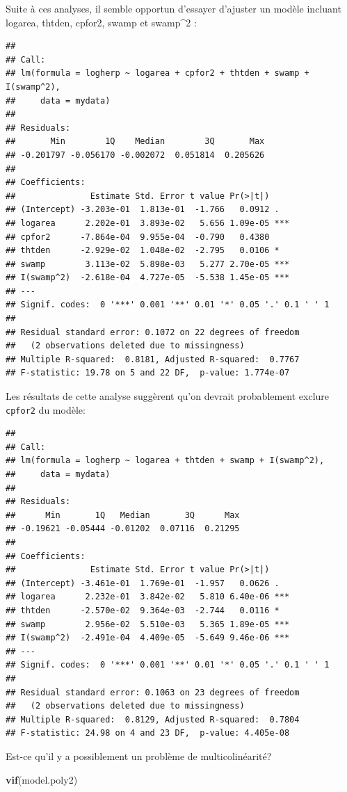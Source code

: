 \documentclass[
  12pt,
]{book}
\newenvironment{Shaded}{\begin{snugshade}}{\end{snugshade}}
\newcommand{\KeywordTok}[1]{\textcolor[rgb]{0.13,0.29,0.53}{\textbf{#1}}}
\newcommand{\NormalTok}[1]{#1}
\begin{document}
Suite à ces analyses, il semble opportun d'essayer d'ajuster un modèle incluant logarea, thtden, cpfor2, swamp et swamp\^{}2 :

\begin{verbatim}
## 
## Call:
## lm(formula = logherp ~ logarea + cpfor2 + thtden + swamp + I(swamp^2), 
##     data = mydata)
## 
## Residuals:
##       Min        1Q    Median        3Q       Max 
## -0.201797 -0.056170 -0.002072  0.051814  0.205626 
## 
## Coefficients:
##               Estimate Std. Error t value Pr(>|t|)    
## (Intercept) -3.203e-01  1.813e-01  -1.766   0.0912 .  
## logarea      2.202e-01  3.893e-02   5.656 1.09e-05 ***
## cpfor2      -7.864e-04  9.955e-04  -0.790   0.4380    
## thtden      -2.929e-02  1.048e-02  -2.795   0.0106 *  
## swamp        3.113e-02  5.898e-03   5.277 2.70e-05 ***
## I(swamp^2)  -2.618e-04  4.727e-05  -5.538 1.45e-05 ***
## ---
## Signif. codes:  0 '***' 0.001 '**' 0.01 '*' 0.05 '.' 0.1 ' ' 1
## 
## Residual standard error: 0.1072 on 22 degrees of freedom
##   (2 observations deleted due to missingness)
## Multiple R-squared:  0.8181, Adjusted R-squared:  0.7767 
## F-statistic: 19.78 on 5 and 22 DF,  p-value: 1.774e-07
\end{verbatim}

Les résultats de cette analyse suggèrent qu'on devrait probablement exclure \texttt{cpfor2} du modèle:

\begin{verbatim}
## 
## Call:
## lm(formula = logherp ~ logarea + thtden + swamp + I(swamp^2), 
##     data = mydata)
## 
## Residuals:
##      Min       1Q   Median       3Q      Max 
## -0.19621 -0.05444 -0.01202  0.07116  0.21295 
## 
## Coefficients:
##               Estimate Std. Error t value Pr(>|t|)    
## (Intercept) -3.461e-01  1.769e-01  -1.957   0.0626 .  
## logarea      2.232e-01  3.842e-02   5.810 6.40e-06 ***
## thtden      -2.570e-02  9.364e-03  -2.744   0.0116 *  
## swamp        2.956e-02  5.510e-03   5.365 1.89e-05 ***
## I(swamp^2)  -2.491e-04  4.409e-05  -5.649 9.46e-06 ***
## ---
## Signif. codes:  0 '***' 0.001 '**' 0.01 '*' 0.05 '.' 0.1 ' ' 1
## 
## Residual standard error: 0.1063 on 23 degrees of freedom
##   (2 observations deleted due to missingness)
## Multiple R-squared:  0.8129, Adjusted R-squared:  0.7804 
## F-statistic: 24.98 on 4 and 23 DF,  p-value: 4.405e-08
\end{verbatim}

Est-ce qu'il y a possiblement un problème de multicolinéarité?

\begin{Shaded}
\begin{Highlighting}[]
\KeywordTok{vif}\NormalTok{(model.poly2)}
\end{Highlighting}
\end{Shaded}
\end{document}
